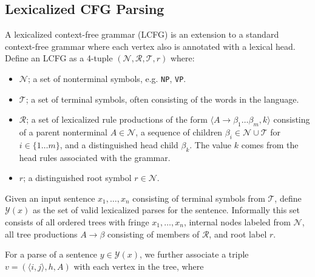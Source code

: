 \documentclass[11pt,letterpaper]{article}
\newcommand{\nonterms}{\mathcal{N}}
\newcommand{\rules}{\mathcal{R}}
\newcommand{\terms}{\mathcal{T}}
\newcommand{\Span}[1]{\langle #1 \rangle}
\newcommand{\Tag}[1]{\texttt{#1}}
\newcommand{\Root}{r}
\begin{document}
\subsection{Lexicalized CFG Parsing}

A lexicalized context-free grammar (LCFG) is an extension to a standard context-free grammar where each vertex also is annotated with a lexical head. Define an LCFG as a 4-tuple $(\nonterms, \rules, \terms, r)$ where:
\begin{itemize}
\item $\nonterms$; a set of nonterminal symbols, e.g. \Tag{NP}, \Tag{VP}.
\item $\terms$; a set of terminal symbols, often consisting of the words in the language.
\item $\rules$; a set of lexicalized rule productions of the form $\langle A \rightarrow \beta_1 \ldots \beta_m, k\rangle$ consisting of a parent nonterminal $A \in \nonterms$, a sequence of children $\beta_i \in \nonterms \cup \terms$ for $i \in \{1\ldots m\}$, and a distinguished head child $\beta_k$. The value $k$ comes from the head rules associated with the grammar.
\item $\Root$; a distinguished root symbol $\Root \in \nonterms$.
\end{itemize}

Given an input sentence $x_1, \ldots, x_n$ consisting of terminal symbols from $\terms$, define $\mathcal{Y}(x)$ as the set of valid lexicalized parses for the sentence. Informally this set consists of all ordered trees with fringe $x_1, \ldots,  x_n$, internal nodes labeled from $\nonterms$, all tree productions  $A \rightarrow \beta$ consisting of members of $\rules$, and root label $\Root$.



For a parse of a sentence $y \in \mathcal{Y}(x)$,
we further associate a triple $v = (\Span{i, j}, h, A)$ with each vertex in the tree, where
\end{document}
